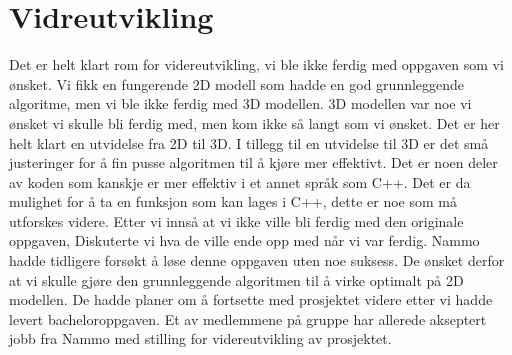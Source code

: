 \section{Vidreutvikling}
Det er helt klart rom for videreutvikling, vi ble ikke ferdig med oppgaven som vi ønsket. Vi fikk en fungerende 2D modell som hadde en god grunnleggende algoritme, men vi ble ikke ferdig med 3D modellen. 3D modellen var noe vi ønsket vi skulle bli ferdig med, men kom ikke så langt som vi ønsket. Det er her helt klart en utvidelse fra 2D til 3D. I tillegg til en utvidelse til 3D er det små justeringer for å fin pusse algoritmen til å kjøre mer effektivt. Det er noen deler av koden som kanskje er mer effektiv i et annet språk som C++. Det er da mulighet for å ta en funksjon som kan lages i C++, dette er noe som må utforskes videre. 
Etter vi innså at vi ikke ville bli ferdig med den originale oppgaven, Diskuterte vi hva de ville ende opp med når vi var ferdig. Nammo hadde tidligere forsøkt å løse denne oppgaven uten noe suksess. De ønsket derfor at vi skulle gjøre den grunnleggende algoritmen til å virke optimalt på 2D modellen. De hadde planer om å fortsette med prosjektet videre etter vi hadde levert bacheloroppgaven. Et av medlemmene på gruppe har allerede akseptert jobb fra Nammo med stilling for videreutvikling av prosjektet. 





